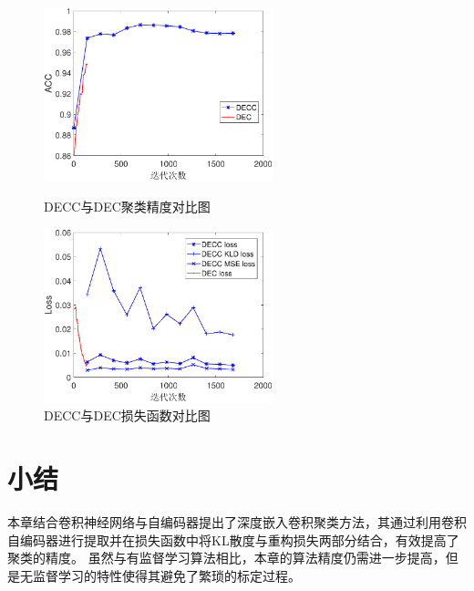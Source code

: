 \begin{figure}[hbt]
	\centering
	\begin{minipage}{7cm}
		\includegraphics[width=6.67cm]{figures/ae/unsurpvised_acc}
    \caption{DECC与DEC聚类精度对比图}
    \label{fig:unsurpvised_acc}

	\end{minipage}
	\hspace{10pt}
	\begin{minipage}{7cm}
		\includegraphics[width=6.67cm]{figures/ae/unsurpvised_loss}
    \caption{DECC与DEC损失函数对比图}
    \label{fig:unsurpvised_loss}

	\end{minipage}

\end{figure}

\section{小结}
\label{sec:decc_summary}
本章结合卷积神经网络与自编码器提出了深度嵌入卷积聚类方法，其通过利用卷积自编码器进行提取并在损失函数中将KL散度与重构损失两部分结合，有效提高了聚类的精度。
虽然与有监督学习算法相比，本章的算法精度仍需进一步提高，但是无监督学习的特性使得其避免了繁琐的标定过程。
